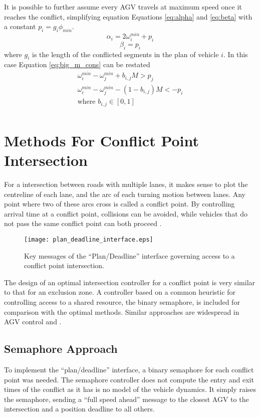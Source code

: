 It is possible to further assume every AGV travels at maximum speed once it reaches the conflict, simplifying equation Equations \ref{eq:alpha} and \ref{eq:beta} with a constant $p_i = g_i \phi_{min}$. 
\begin{equation}
\alpha_i = 2\omega_i^{min} + p_i
\end{equation}
\begin{equation}
\beta_i = p_i
\end{equation}
 where $g_i$ is the length of the conflicted segments in the plan of vehicle $i$. In this case Equation \ref{eq:big_m_cons} can be restated 
\begin{equation}
\begin{array}{cc}
\omega_i^{min} - \omega_j^{min} + b_{i,j}M > p_j \\
\omega_i^{min} - \omega_j^{min}  - (1-b_{i,j})M < -p_i \\
\textrm{where } b_{i,j}\in[0,1] \\
\end{array}
\label{eq:minlp}
\end{equation}

\section{Methods For Conflict Point Intersection}
For a intersection between roads with multiple lanes, it makes sense to plot the centreline of each lane, and the arc of each turning motion between lanes. Any point where two of these arcs cross is called a conflict point. By controlling arrival time at a conflict point, collisions can be avoided, while vehicles that do not pass the same conflict point can both proceed \cite{Levin2017}.

\begin{figure}[ht]
	\centering
	\texttt{[image: plan\_deadline\_interface.eps]}
	\caption{Key messages of the ``Plan/Deadline'' interface governing access to a conflict point intersection.}
	\label{fig:plan_deadline_interface}
\end{figure}

The design of an optimal intersection controller for a conflict point is very similar to that for an exclusion zone. A controller based on a common heuristic for controlling access to a shared resource, the binary semaphore, is included for comparison with the optimal methods.  Similar approaches are widespread in AGV control \cite{Duinkerken1999} and \cite{Lee2019}.
 
  
\subsection{Semaphore Approach}
 To implement the ``plan/deadline'' interface, a binary semaphore for each conflict point was needed. The semaphore controller does not compute the entry and exit times of the conflict as it has is no model of the vehicle dynamics. It simply raises the semaphore, sending a ``full speed ahead'' message to the closest AGV to the intersection and a position deadline to all others.
 

